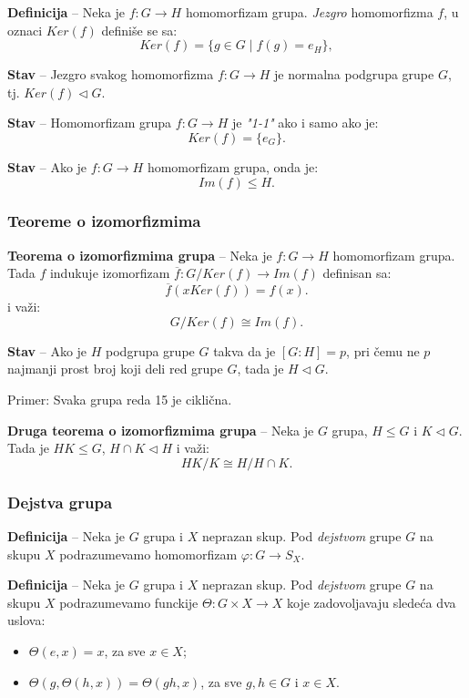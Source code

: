 \documentclass[a4paper,12pt]{article}
\newcommand{\f}[1]{\(#1\)}
\begin{document}
\textbf{Definicija} -- Neka je \f{f : G \rightarrow H} homomorfizam grupa. \emph{Jezgro} homomorfizma \f{f}, u oznaci \f{Ker(f)} definiše se sa:
\[
  Ker(f) = \{ g \in G \mid f(g) = e_H \},
\]

\textbf{Stav} -- Jezgro svakog homomorfizma \f{f:G \rightarrow H} je normalna podgrupa grupe \f{G}, tj. \f{Ker(f) \triangleleft G}.

\textbf{Stav} -- Homomorfizam grupa \f{f:G \rightarrow H} je \emph{"1-1"} ako i samo ako je:
\[
  Ker(f) = \{ e_G \}.
\]

\textbf{Stav} -- Ako je \f{f:G \rightarrow H} homomorfizam grupa, onda je:
\[
  Im(f) \leq H.
\]

\subsubsection{Teoreme o izomorfizmima}

\textbf{Teorema o izomorfizmima grupa} -- Neka je \f{f:G \rightarrow H} homomorfizam grupa. Tada \f{f} indukuje
izomorfizam \f{\overline{f}: G/Ker(f) \rightarrow Im(f)} definisan sa:
\[
  \overline{f}(xKer(f)) = f(x).
\]
i važi:
\[
  G/Ker(f) \cong Im(f).
\]

\smallskip
\textbf{Stav} -- Ako je \f{H} podgrupa grupe \f{G} takva da je \f{[G:H] = p}, pri čemu ne \f{p} najmanji
prost broj koji deli red grupe \f{G}, tada je \f{H \triangleleft G}.

Primer: Svaka grupa reda 15 je ciklična.

\bigskip
\textbf{Druga teorema o izomorfizmima grupa} -- Neka je \f{G} grupa, \f{H \leq G} i \f{K \triangleleft G}. Tada je
\f{HK \leq G}, \f{H \cap K \triangleleft H} i važi:
\[
  HK/K \cong H/H \cap K.
\]

\subsubsection{Dejstva grupa}

\textbf{Definicija} -- Neka je \f{G} grupa i \f{X} neprazan skup. Pod \emph{dejstvom} grupe \f{G} na skupu \f{X}
podrazumevamo homomorfizam \f{\varphi: G \rightarrow S_X}.

\textbf{Definicija} -- Neka je \f{G} grupa i \f{X} neprazan skup. Pod \emph{dejstvom} grupe \f{G} na skupu \f{X}
podrazumevamo funckije \f{\Theta: G \times X \rightarrow X} koje zadovoljavaju sledeća dva uslova:
\begin{itemize}
  \item \f{\Theta(e, x) = x}, za sve \f{x \in X};
  \item \f{\Theta(g, \Theta(h, x)) = \Theta(gh, x)}, za sve \f{g, h \in G} i \f{x \in X}.
\end{itemize}
\end{document}
